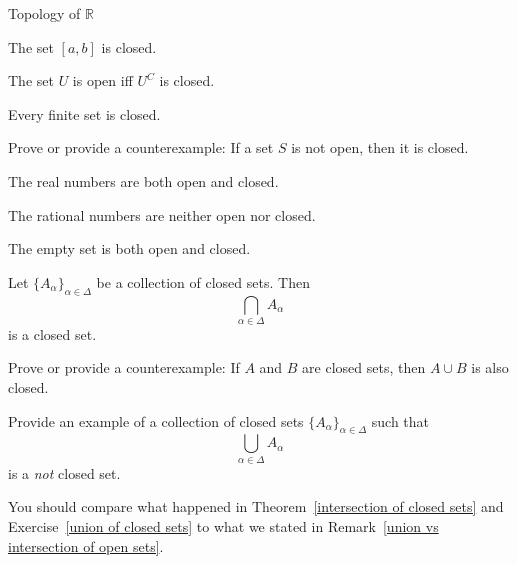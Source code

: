 \begin{section}{Topology of $\mathbb{R}$}
\begin{exercise}
\end{exercise}

\begin{theorem}
The set $[a,b]$ is closed.
\end{theorem}

\begin{theorem}
The set $U$ is open iff $U^C$ is closed.
\end{theorem}

\begin{theorem}
Every finite set is closed.
\end{theorem}

\begin{problem}
Prove or provide a counterexample: If a set $S$ is not open, then it is closed.
\end{problem}

\begin{theorem}
The real numbers are both open and closed.
\end{theorem}

\begin{theorem}
The rational numbers are neither open nor closed.
\end{theorem}

\begin{theorem}
The empty set is both open and closed.
\end{theorem}

\begin{theorem}\label{intersection of closed sets}
Let $\{A_{\alpha}\}_{\alpha\in\Delta}$ be a collection of closed sets.  Then
\[
\bigcap_{\alpha\in \Delta} A_{\alpha}
\]
is a closed set.
\end{theorem}

\begin{problem}
Prove or provide a counterexample: If $A$ and $B$ are closed sets, then $A\cup B$ is also closed.
\end{problem}

\begin{exercise}\label{union of closed sets}
Provide an example of a collection of closed sets $\{A_{\alpha}\}_{\alpha\in\Delta}$ such that 
\[
\bigcup_{\alpha\in \Delta} A_{\alpha}
\]
is a \emph{not} closed set.
\end{exercise}

\begin{remark}
You should compare what happened in Theorem~\ref{intersection of closed sets} and Exercise~\ref{union of closed sets} to what we stated in Remark~\ref{union vs intersection of open sets}.
\end{remark}

\end{section}